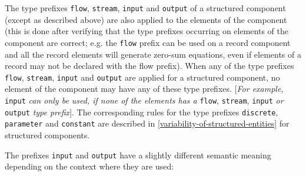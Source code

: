 The type prefixes \lstinline!flow!, \lstinline!stream!, \lstinline!input!
and \lstinline!output! of a structured
component (except as described above) are also applied to the elements
of the component (this is done after verifying that the type prefixes
occurring on elements of the component are correct; e.g. the \lstinline!flow! prefix
can be used on a record component and all the record elements will
generate zero-sum equations, even if elements of a record may not be
declared with the flow prefix). When any of the type prefixes \lstinline!flow!,
\lstinline!stream!, \lstinline!input! and \lstinline!output! are applied for a structured component, no
element of the component may have any of these type prefixes.
{[}\emph{For example,} \lstinline!input! \emph{can only be used, if none of the
elements has a} \lstinline!flow!, \lstinline!stream!, \lstinline!input! \emph{or}
\lstinline!output! \emph{type
prefix}{]}. The corresponding rules for the type prefixes \lstinline!discrete!,
\lstinline!parameter! and \lstinline!constant! are described in \autoref{variability-of-structured-entities} for structured
components.

The prefixes \lstinline!input! and \lstinline!output! have a slightly different semantic meaning
depending on the context where they are used:


